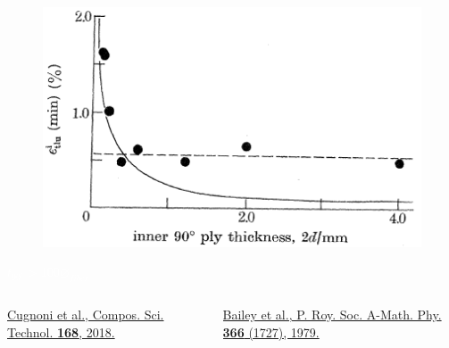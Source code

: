 \documentclass[first,firstsupp,lastsupp,last,hyperref,table]{ETHclass}
\begin{document}
\begin{frame}
\begin{columns}[c]
\begin{column}{0.5\textwidth}
\centering
\begin{figure}
\centering
\includegraphics[width=\columnwidth]{bailey.png}
\end{figure}
\textcolor{white}{\tiny$t_{90^{\circ}}>100\diameter_{fiber}$}
\end{column}
\end{columns}
\vspace{0.15cm}
\begin{columns}[b]
\begin{column}{0.5\textwidth}
\centering
\pgfmathsetmacro{}
\pgfmathsetmacro{}
{\fontsize{\fontsizeref}{\stretchref} \selectfont \href{https://doi.org/10.1016/j.compscitech.2018.08.037}{Cugnoni et al., Compos. Sci. Technol. \textbf{168}, 2018.}}
\end{column}
\begin{column}{0.5\textwidth}
\centering
\pgfmathsetmacro{}
\pgfmathsetmacro{}
{\fontsize{\fontsizeref}{\stretchref} \selectfont \href{https://doi.org/10.1098/rspa.1979.0071}{Bailey et al., P. Roy. Soc. A-Math. Phy. \textbf{366} (1727), 1979.}}
\end{column}
\end{columns}
\end{frame}

\end{document}
